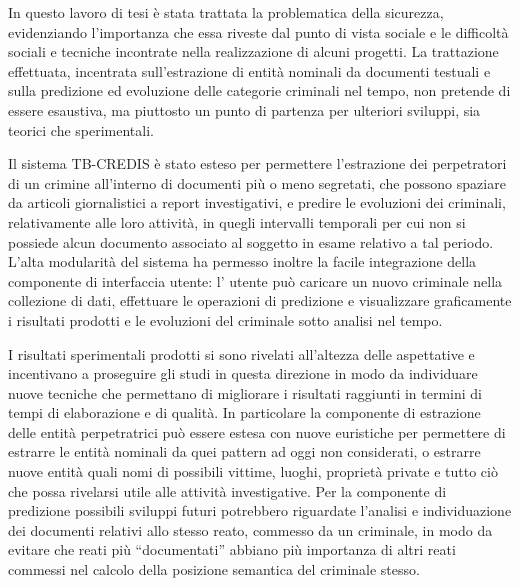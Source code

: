 
In questo lavoro di tesi è stata trattata la problematica della sicurezza, evidenziando l'importanza che essa riveste dal punto di vista sociale e le difficoltà sociali e tecniche incontrate nella realizzazione di alcuni progetti.
La trattazione effettuata, incentrata sull'estrazione di entità nominali da documenti testuali e sulla predizione ed evoluzione delle categorie criminali nel tempo, non pretende di essere esaustiva, ma piuttosto un punto di partenza per ulteriori sviluppi, sia teorici che sperimentali. 

Il sistema TB-CREDIS è stato esteso per permettere l'estrazione dei perpetratori di un crimine all'interno di documenti più o meno segretati, che possono spaziare da articoli giornalistici a report investigativi, e predire le evoluzioni dei criminali, relativamente alle loro attività, in quegli intervalli temporali per cui non si possiede alcun documento associato al soggetto in esame relativo a tal periodo. L'alta modularità del sistema ha permesso inoltre la facile integrazione della componente di interfaccia utente: l' utente può caricare un nuovo criminale nella collezione di dati, effettuare le operazioni di predizione e visualizzare graficamente i risultati prodotti e le evoluzioni del criminale sotto analisi nel tempo.

I risultati sperimentali prodotti si sono rivelati all'altezza delle aspettative e incentivano a proseguire gli studi in questa direzione in modo da individuare nuove tecniche che permettano di migliorare i risultati raggiunti in termini di tempi di elaborazione e di qualità. 
In particolare la componente di estrazione delle entità perpetratrici può essere estesa con nuove euristiche per permettere di estrarre le entità nominali da quei pattern ad oggi non considerati, o estrarre nuove entità quali nomi di possibili vittime, luoghi, proprietà private e tutto ciò che possa rivelarsi utile alle attività investigative. 
Per la componente di predizione possibili sviluppi futuri potrebbero riguardate l'analisi e individuazione dei documenti relativi allo stesso reato, commesso da un criminale, in modo da evitare che reati più ``documentati'' abbiano più importanza di altri reati commessi nel calcolo della posizione semantica del criminale stesso.